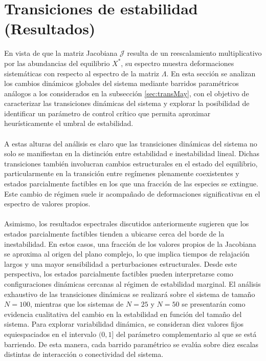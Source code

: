 \chapter{Transiciones de estabilidad (Resultados)}

\setlength{\parindent}{0cm} 

En vista de que la matriz Jacobiana $\mathcal{J}$ resulta de un reescalamiento multiplicativo por las abundancias del equilibrio $X^*$, su espectro muestra deformaciones sistemáticas con respecto al espectro de la matriz $\Lambda$. En esta sección se analizan los cambios dinámicos globales del sistema mediante barridos paramétricos análogos a los considerados en la subsección \ref{sec:transMay}, con el objetivo de caracterizar las transiciones dinámicas del sistema y explorar la posibilidad de identificar un parámetro de control crítico que permita aproximar heurísticamente el umbral de estabilidad.
\\
\\
A estas alturas del análisis es claro que las transiciones dinámicas del sistema no solo se manifiestan en la distinción entre estabilidad e inestabilidad lineal. Dichas transiciones también involucran cambios estructurales en el estado del equilibrio, particularmente en la transición entre regímenes plenamente coexistentes y estados parcialmente factibles en los que una fracción de las especies se extingue. Este cambio de régimen suele ir acompañado de deformaciones significativas en el espectro de valores propios.\\
\\
Asimismo, los resultados espectrales discutidos anteriormente sugieren que los estados parcialmente factibles tienden a ubicarse cerca del borde de la inestabilidad. En estos casos, una fracción de los valores propios de la Jacobiana se aproxima al origen del plano complejo, lo que implica tiempos de relajación largos y una mayor sensibilidad a perturbaciones estructurales. Desde este perspectiva, los estados parcialmente factibles pueden interpretarse como configuraciones dinámicas cercanas al régimen de estabilidad marginal.
\newpage
El análisis exhaustivo de las transiciones dinámicas se realizará sobre el sistema de tamaño $N=100$, mientras que los sistemas de $N=25$ y $N=50$ se presentarán como evidencia cualitativa del cambio en la estabilidad en función del tamaño del sistema. Para explorar variabilidad dinámica, se consideran diez valores fijos equiespaciados en el intervalo $(0,1]$ del parámetro complementario al que se está barriendo. De esta manera, cada barrido paramétrico se evalúa sobre diez escalas distintas de interacción o conectividad del sistema. \\
